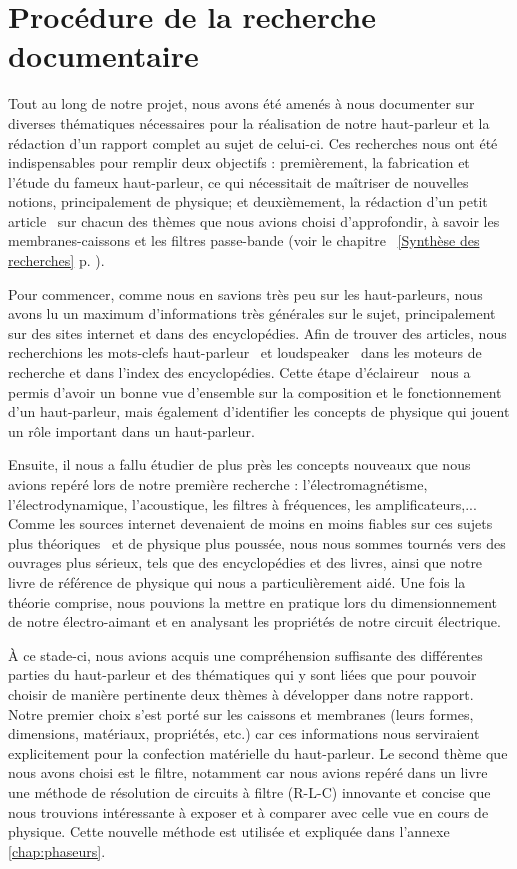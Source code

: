 \section{Procédure de la recherche documentaire} 
\label{sec:app/demarche}

Tout au long de notre projet, nous avons été amenés à nous documenter sur diverses thématiques nécessaires pour la réalisation de notre haut-parleur et la rédaction d'un rapport complet au sujet de celui-ci.
Ces recherches nous ont été indispensables pour remplir deux objectifs : premièrement, la fabrication et l'étude du fameux haut-parleur, ce qui nécessitait de maîtriser de nouvelles notions, principalement de physique; et deuxièmement, la rédaction d'un petit \og article \fg\ sur chacun des thèmes que nous avions choisi d'approfondir, à savoir les membranes-caissons et les filtres passe-bande (voir le chapitre ~\ref{Synthèse des recherches} p. \pageref{Synthèse des recherches}).
\newline

Pour commencer, comme nous en savions très peu sur les haut-parleurs, nous avons lu un maximum d’informations très générales sur le sujet, principalement sur des sites internet et dans des encyclopédies. Afin de trouver des articles, nous recherchions les mots-clefs \og haut-parleur \fg\ et \og loudspeaker \fg\ dans les moteurs de recherche et dans l'index des encyclopédies. 
Cette étape \og d'éclaireur \fg\ nous a permis d'avoir un bonne vue d’ensemble sur la composition et le fonctionnement d’un haut-parleur, mais également d'identifier les concepts de physique qui jouent un rôle important dans un haut-parleur.  

Ensuite, il nous a fallu étudier de plus près les concepts nouveaux que nous avions repéré lors de notre première recherche : l'électromagnétisme, l'électrodynamique, l’acoustique, les filtres à fréquences, les amplificateurs,... Comme les sources internet devenaient de moins en moins fiables sur ces sujets plus \og théoriques \fg\ et de physique plus poussée, nous nous sommes tournés vers des ouvrages plus sérieux, tels que des encyclopédies et des livres, ainsi que notre livre de référence de physique \cite{Young} qui nous a particulièrement aidé. Une fois la théorie comprise, nous pouvions la mettre en pratique lors du dimensionnement de notre électro-aimant et en analysant les propriétés de notre circuit électrique. 
\newline

À ce stade-ci, nous avions acquis une compréhension suffisante des différentes parties du haut-parleur et des thématiques qui y sont liées que pour pouvoir choisir de manière pertinente deux thèmes à développer dans notre rapport. Notre premier choix s'est  porté sur les caissons et membranes (leurs formes, dimensions, matériaux, propriétés, etc.) car ces informations nous serviraient explicitement pour la confection matérielle du haut-parleur. Le second thème que nous avons choisi est le filtre, notamment car nous avions repéré dans un livre une méthode de résolution de circuits à filtre (R-L-C) innovante et concise que nous trouvions intéressante à exposer et à comparer avec celle vue en cours de physique. Cette nouvelle méthode est utilisée et expliquée dans l'annexe \ref{chap:phaseurs}.

